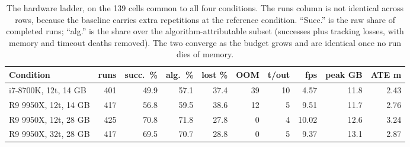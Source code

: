 \begin{table}[H]
\centering
\caption{The hardware ladder, on the 139 cells common to all four conditions. The runs column is not identical across rows, because the baseline carries extra repetitions at the reference condition. ``Succ.'' is the raw share of completed runs; ``alg.'' is the share over the algorithm-attributable subset (successes plus tracking losses, with memory and timeout deaths removed). The two converge as the budget grows and are identical once no run dies of memory.}
\label{tab:hw-ladder}
\footnotesize
\setlength{\tabcolsep}{4pt}
\begin{tabular}{@{}lrrrrrrrrr@{}}
\toprule
Condition & runs & succ.\ \% & alg.\ \% & lost \% & OOM & t/out & fps & peak GB & ATE m \\
\midrule
i7-8700K, 12t, 14 GB & 401 & 49.9 & 57.1 & 37.4 & 39 & 10 & 4.57 & 11.8 & 2.43 \\
R9 9950X, 12t, 14 GB & 417 & 56.8 & 59.5 & 38.6 & 12 & 5 & 9.51 & 11.7 & 2.76 \\
R9 9950X, 12t, 28 GB & 425 & 70.8 & 71.8 & 27.8 & 0 & 4 & 10.02 & 12.6 & 3.24 \\
R9 9950X, 32t, 28 GB & 417 & 69.5 & 70.7 & 28.8 & 0 & 5 & 9.37 & 13.1 & 2.87 \\
\bottomrule
\end{tabular}
\end{table}
